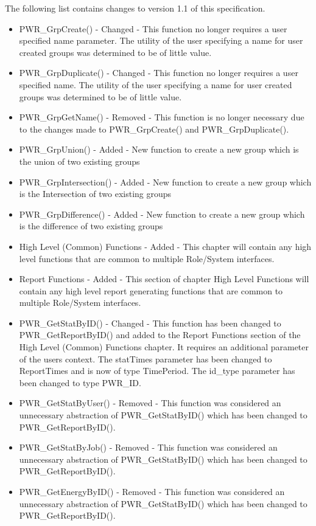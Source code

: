 The following list contains changes to version 1.1 of this specification.

\begin{itemize}
    \item{PWR_GrpCreate() -  Changed - This function no longer requires a user specified name parameter. The utility of the user specifying a name for user created groups was determined to be of little value.}
    \item{PWR_GrpDuplicate() -  Changed - This function no longer requires a user specified name. The utility of the user specifying a name for user created groups was determined to be of little value.}
    \item{PWR_GrpGetName() - Removed - This function is no longer necessary due to the changes made to PWR_GrpCreate() and PWR_GrpDuplicate().}
    \item{PWR_GrpUnion() - Added - New function to create a new group which is the  union of two existing groups}
    \item{PWR_GrpIntersection() - Added - New function to create a new group which is the Intersection of two existing groups}
    \item{PWR_GrpDifference() - Added - New function to create a new group which is the difference of two existing groups}
    \item{High Level (Common) Functions - Added - This chapter will contain any high level functions that are common to multiple Role/System interfaces.}
    \item{Report Functions -   Added - This section of chapter High Level Functions will contain any high level report generating functions that are common to multiple Role/System interfaces.}
    \item{PWR_GetStatByID() - Changed - This function has been changed to PWR_GetReportByID() and added to the Report Functions section of the High Level (Common) Functions chapter. It requires an additional parameter of the users context. The statTimes parameter has been changed to ReportTimes and is now of type TimePeriod.  The id_type parameter has been changed to type PWR_ID. } 
    \item{PWR_GetStatByUser() - Removed - This function was considered an unnecessary abstraction of PWR_GetStatByID() which has been changed to PWR_GetReportByID().}
    \item{PWR_GetStatByJob() - Removed - This function was considered an unnecessary abstraction of PWR_GetStatByID() which has been changed to PWR_GetReportByID().}
    \item{PWR_GetEnergyByID() - Removed - This function was considered an unnecessary abstraction of PWR_GetStatByID() which has been changed to PWR_GetReportByID().}

\end{itemize}
